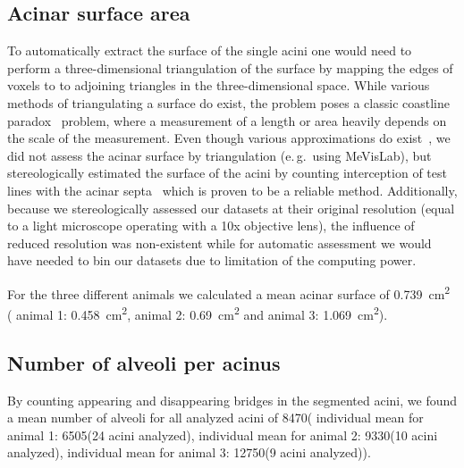 \documentclass[draft,a4paper,DIVcalc,abstract,english]{scrartcl}
\newcommand{\eg}{e.\,g.\ }
\newcommand{\numberofaciniB}{24}
\newcommand{\numberofaciniD}{10}
\newcommand{\numberofaciniE}{9}
\newcommand{\numberofalveoliB}{6505}
\newcommand{\numberofalveoliD}{9330}
\newcommand{\numberofalveoliE}{12750}
\newcommand{\meannumberofalveoli}{8470} %
\newcommand{\acinarsurfaceB}{0.458} %
\newcommand{\acinarsurfaceD}{0.69} %
\newcommand{\acinarsurfaceE}{1.069} %
\newcommand{\meanacinarsurface}{0.739} %
\newcommand{\airspacesurfaceB}{4214} %
\newcommand{\airspacesurfaceD}{3628} %
\newcommand{\airspacesurfaceE}{5177} %
\newcommand{\meanairspacesurface}{4340} %
\begin{document}
\subsection{Acinar surface area}
To automatically extract the surface of the single acini one would need to perform a three-dimensional triangulation of the surface by mapping the edges of voxels to to adjoining triangles in the three-dimensional space.
While various methods of triangulating a surface do exist, the problem poses a classic coastline paradox~\citep{Mandelbrot1967a} problem, where a measurement of a length or area heavily depends on the scale of the measurement.
Even though various approximations do exist~\citep{Lorensen1987,Schneiders1996a}, we did not assess the acinar surface by triangulation (\eg using MeVisLab), but stereologically estimated the surface of the acini by counting interception of test lines with the acinar septa~\citep{Hsia2010} which is proven to be a reliable method.
Additionally, because we stereologically assessed our datasets at their original resolution (equal to a light microscope operating with a 10x objective lens), the influence of reduced resolution was non-existent while for automatic assessment we would have needed to bin our datasets due to limitation of the computing power. 

For the three different animals we calculated a mean acinar surface of \SI{\meanacinarsurface}{\centi\metre\squared} (%
animal 1: \SI{\acinarsurfaceB}{\centi\metre\squared},
animal 2: \SI{\acinarsurfaceD}{\centi\metre\squared} and
animal 3: \SI{\acinarsurfaceE}{\centi\metre\squared}).


\subsection{Number of alveoli per acinus}
By counting appearing and disappearing bridges in the segmented acini, we found a mean number of alveoli for all analyzed acini of \meannumberofalveoli\xspace (%
individual mean for animal 1: \numberofalveoliB\xspace (\numberofaciniB\xspace acini analyzed),
individual mean for animal 2: \numberofalveoliD\xspace (\numberofaciniD\xspace acini analyzed),
individual mean for animal 3: \numberofalveoliE\xspace (\numberofaciniE\xspace acini analyzed)).
\end{document}
